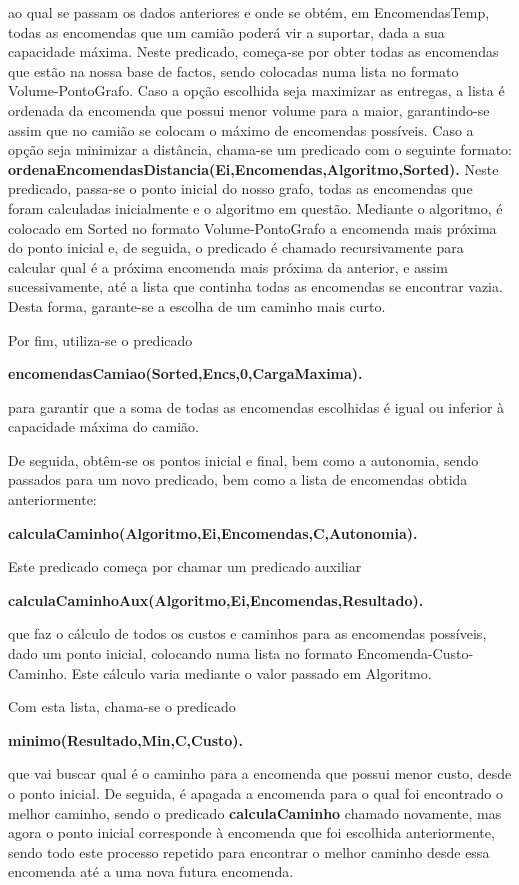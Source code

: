\documentclass[a4paper]{article}
\begin{document}
ao qual se passam os dados anteriores e onde se obtém, em EncomendasTemp, todas as encomendas que um camião poderá vir a suportar, dada a sua capacidade máxima. Neste predicado, começa-se por obter todas as encomendas que estão na nossa base de factos, sendo colocadas numa lista no formato Volume-PontoGrafo. Caso a opção escolhida seja maximizar as entregas, a lista é ordenada da encomenda que possui menor volume para a maior, garantindo-se assim que no camião se colocam o máximo de encomendas possíveis. Caso a opção seja minimizar a distância, chama-se um predicado com o seguinte formato: \textbf{ordenaEncomendasDistancia(Ei,Encomendas,Algoritmo,Sorted).} Neste predicado, passa-se o ponto inicial do nosso grafo, todas as encomendas que foram calculadas inicialmente e o algoritmo em questão. Mediante o algoritmo, é colocado em Sorted no formato Volume-PontoGrafo a encomenda mais próxima do ponto inicial e, de seguida, o predicado é chamado recursivamente para calcular qual é a próxima encomenda mais próxima da anterior, e assim sucessivamente, até a lista que continha todas as encomendas se encontrar vazia. Desta forma, garante-se a escolha de um caminho mais curto.

Por fim, utiliza-se o predicado

\centerline{\textbf{encomendasCamiao(Sorted,Encs,0,CargaMaxima).}}

para garantir que a soma de todas as encomendas escolhidas é igual ou inferior à capacidade máxima do camião.

De seguida, obtêm-se os pontos inicial e final, bem como a autonomia, sendo passados para um novo predicado, bem como a lista de encomendas obtida anteriormente:

\centerline{\textbf{calculaCaminho(Algoritmo,Ei,Encomendas,C,Autonomia).}}

Este predicado começa por chamar um predicado auxiliar

\centerline{\textbf{calculaCaminhoAux(Algoritmo,Ei,Encomendas,Resultado).}}

que faz o cálculo de todos os custos e caminhos para as encomendas possíveis, dado um ponto inicial, colocando numa lista no formato Encomenda-Custo-Caminho. Este cálculo varia mediante o valor passado em Algoritmo. 

Com esta lista, chama-se o predicado

\centerline{\textbf{minimo(Resultado,Min,C,Custo).}}

que vai buscar qual é o caminho para a encomenda que possui menor custo, desde o ponto inicial. De seguida, é apagada a encomenda para o qual foi encontrado o melhor caminho, sendo o predicado \textbf{calculaCaminho} chamado novamente, mas agora o ponto inicial corresponde à encomenda que foi escolhida anteriormente, sendo todo este processo repetido para encontrar o melhor caminho desde essa encomenda até a uma nova futura encomenda.
\end{document}

